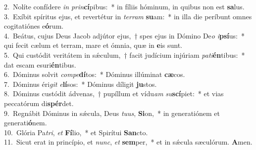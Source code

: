 {2.~}Nolíte confídere \textit{in} \textit{prin}\textbf{cí}pibus:~* in fíliis hóminum, in quibus non est \textbf{sa}lus.\\
{3.~}Exíbit spíritus ejus, et revertétur in \textit{ter}\textit{ram} \textbf{su}am:~* in illa die períbunt omnes cogitatiónes e\textbf{ó}rum.\\
{4.~}Beátus, cujus Deus Jacob adjútor ejus,~† spes ejus in Dómino De\textit{o} \textit{i}\textbf{psí}us:~* qui fecit cælum et terram, mare et ómnia, quæ in \textbf{e}is sunt.\\
{5.~}Qui custódit veritátem in sǽculum,~† facit judícium injúriam \textit{pa}\textit{ti}\textbf{én}tibus:~* dat escam esuri\textbf{én}tibus.\\
{6.~}Dóminus solvit \textit{com}\textit{pe}\textbf{dí}tos:~* Dóminus illúminat \textbf{cæ}cos.\\
{7.~}Dóminus éri\textit{git} \textit{e}\textbf{lí}sos:~* Dóminus díligit \textbf{ju}stos.\\
{8.~}Dóminus custódit ádvenas,~† pupíllum et vídu\textit{am} \textit{su}\textbf{scí}piet:~* et vias peccatórum di\textbf{spér}det.\\
{9.~}Regnábit Dóminus in sǽcula, Deus \textit{tu}\textit{us}, \textbf{Si}on,~* in generatiónem et generati\textbf{ó}nem.\\
{10.~}Glória Pa\textit{tri}, \textit{et} \textbf{Fí}lio,~* et Spirítui \textbf{San}cto.\\
{11.~}Sicut erat in princípio, et \textit{nunc}, \textit{et} \textbf{sem}per,~* et in sǽcula sæculórum. \textbf{A}men.\\
